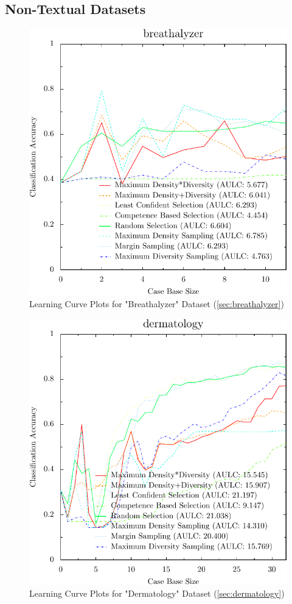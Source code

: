 \documentclass[a4paper,11pt]{report}
\begin{document}
\subsection{Non-Textual Datasets}

\begin{figure}[h!]
\includegraphics{./Plots/breathalyzer}
\caption{Learning Curve Plots for "Breathalyzer" Dataset (\ref{sec:breathalyzer})}
\end{figure}

\begin{figure}[h!]
\includegraphics{./Plots/dermatology}
\caption{Learning Curve Plots for "Dermatology" Dataset (\ref{sec:dermatology})}
\end{figure}
\end{document}
